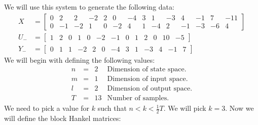 We will use this system to generate the following data:
\begin{align*}
	X   &= \begin{bmatrix} 0& 2& 2&-2&2& 0&-4&3& 1&-3& 4&-1& 7&-11 \\ 
	                       0&-1&-2& 1&0&-2& 4&1&-4& 2&-1&-3&-6& 4 \end{bmatrix} \\
	U_- &= \begin{bmatrix} 1& 2& 0& 1&0&-2&-1&0& 1& 2& 0&10&-5 \end{bmatrix} \\
	Y_- &= \begin{bmatrix} 0& 1& 1&-2&2& 0&-4&3& 1&-3& 4&-1& 7 \end{bmatrix} 
\end{align*}
We will begin with defining the following values:
\[\begin{array}{rcll}
	n & = & 2 & \mbox{Dimension of state space.} \\
	m & = & 1 & \mbox{Dimension of input space.} \\
	l & = & 2 & \mbox{Dimension of output space.} \\
	T & = & 13 & \mbox{Number of samples.}
\end{array}\]
We need to pick a value for $k$ such that $n < k < \frac{1}{2} T$. We will pick $k = 3$. Now we will define the block Hankel matrices:
